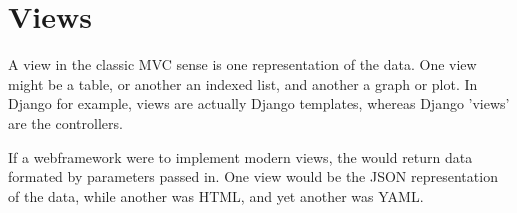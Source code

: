 \chapter{Views}

A view in the classic MVC sense is one representation of the data. One
view might be a table, or another an indexed list, and another a graph
or plot. In Django for example, views are actually Django templates,
whereas Django 'views' are the controllers.

If a webframework were to implement modern views, the would return data
formated by parameters passed in. One view would be the JSON
representation of the data, while another was HTML, and yet another was
YAML.
